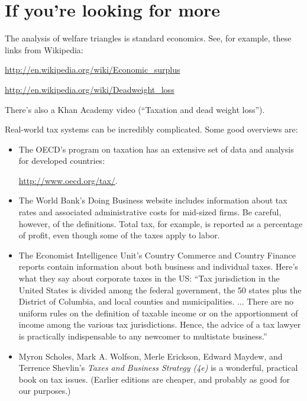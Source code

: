 \section*{If you're looking for more}

The analysis of welfare triangles is standard economics.
See, for example, these links from Wikipedia:

\vspace*{\parskip}
\centerline{\url{http://en.wikipedia.org/wiki/Economic_surplus}}
\centerline{\url{http://en.wikipedia.org/wiki/Deadweight_loss}}

There's also a Khan Academy video (``Taxation and dead weight loss'').

Real-world tax systems can be incredibly complicated.
Some good overviews are:
%
\begin{itemize}
\item The OECD's program on taxation  has an extensive
set of data and analysis for developed countries:

\vspace*{\parskip}
\centerline{\url{http://www.oecd.org/tax/}.}

\item The World Bank's Doing Business website includes information about
tax rates and associated administrative costs for mid-sized firms.
Be careful, however, of the definitions.
Total tax, for example, is reported as a percentage of
profit, even though some of the taxes
apply to labor.


\item The Economist Intelligence Unit's Country Commerce
and Country Finance reports contain information about
both business and individual taxes.
Here's what they say about corporate taxes in the US:
``Tax jurisdiction in the United States is divided among the federal
government, the 50 states plus the District of Columbia,
and local counties and municipalities. ...
There are no uniform rules on the definition of taxable income or on the
apportionment of income among the various tax jurisdictions.
Hence, the advice of a tax lawyer is practically indispensable
to any newcomer to multistate business.''

\item
 Myron Scholes, Mark A. Wolfson, Merle Erickson, Edward Maydew, and
 Terrence Shevlin's {\it Taxes and Business Strategy (4e)\/}
 is a wonderful, practical book on tax issues.
 (Earlier editions are cheaper, and probably as good for our purposes.)

\end{itemize}

